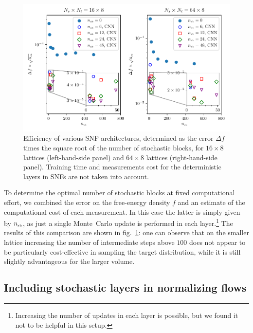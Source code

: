\documentclass[11pt]{article}
\newcommand{\nsb}{n_{\mbox{\tiny{sb}}}}
\begin{document}
\begin{figure}[!htb]
\begin{center}
\includegraphics*[width=\textwidth]{error_cost.pdf}
\caption{\label{fig:f_efficiency} Efficiency of various SNF architectures, determined as the error $\Delta f$ times the square root of the number of stochastic blocks, for $16\times8$ lattices (left-hand-side panel) and $64 \times 8$ lattices (right-hand-side panel). Training time and measurements cost for the deterministic layers in SNFs are not taken into account.}
\end{center}
\end{figure}

To determine the optimal number of stochastic blocks at fixed computational effort, we combined the error on the free-energy density $f$ and an estimate of the computational cost of each measurement. In this case the latter is simply given by $\nsb$, as just a single Monte~Carlo update is performed in each layer.\footnote{Increasing the number of updates in each layer is possible, but we found it not to be helpful in this setup.} The results of this comparison are shown in fig.~\ref{fig:f_efficiency}: one can observe that on the smaller lattice increasing the number of intermediate steps above $100$ does not appear to be particularly cost-effective in sampling the target distribution, while it is still slightly advantageous for the larger volume.

\subsection{Including stochastic layers in normalizing flows}
\end{document}
